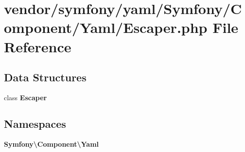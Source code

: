 \section{vendor/symfony/yaml/\+Symfony/\+Component/\+Yaml/\+Escaper.php File Reference}
\label{_escaper_8php}
\subsection*{Data Structures}
\begin{DoxyCompactItemize}
\item 
class {\bf Escaper}
\end{DoxyCompactItemize}
\subsection*{Namespaces}
\begin{DoxyCompactItemize}
\item 
 {\bf Symfony\textbackslash{}\+Component\textbackslash{}\+Yaml}
\end{DoxyCompactItemize}
